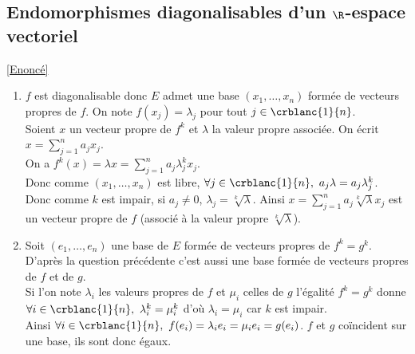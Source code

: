 \documentclass[8pt]{book}
\begin{document}
	\subsection{Endomorphismes diagonalisables d'un $\R$-espace vectoriel }
	\label{Endomorphismes diagonalisables d'un R-espace vectoriel corrigé}
	\textcolor{blue}{\hyperref[Endomorphismes diagonalisables d'un R-espace vectoriel]{[Enoncé]}}\\
	\begin{enumerate}[leftmargin=*]
		\item $f$ est diagonalisable donc $E$ admet une base $(x_1,\dots,x_n)$ formée de vecteurs propres de $f$. On note $f(x_j)=\lambda_j$ pour tout $j\in \crblanc{1}{n}$.\\
		Soient $x$ un vecteur propre de $f^k$ et $\lambda$ la valeur propre associée. On écrit $x=\displaystyle\sum_{j=1}^na_jx_j$.\\
		On a $f^k(x)=\lambda x=\displaystyle\sum_{j=1}^na_j\lambda_j^kx_j$.\\
		Donc comme $(x_1,\dots,x_n)$ est libre, $\forall j\in \crblanc{1}{n},\ a_j\lambda=a_j\lambda_j^k$.\\
		Donc comme $k$ est impair, si $a_j\ne 0$, $\lambda_j=\sqrt[k]\lambda$. Ainsi $x=\displaystyle\sum_{j=1}^na_j\sqrt[k]\lambda x_j$ est un vecteur propre de $f$ (associé à la valeur propre $\sqrt[k]\lambda$).
		\item Soit $(e_1,\dots,e_n)$ une base de $E$ formée de vecteurs propres de $f^k=g^k$. D'après la question précédente c'est aussi une base formée de vecteurs propres de $f$ et de $g$.\\
		Si l'on note $\lambda_i$ les valeurs propres de $f$ et $\mu_i$ celles de $g$ l'égalité $f^k=g^k$ donne $\forall i\in \crblanc{1}{n},\ \lambda_i^k=\mu_i^k$ d'où $\lambda_i=\mu_i$ car $k$ est impair.\\
		Ainsi $\forall i\in \crblanc{1}{n},\ f(e_i)=\lambda_ie_i=\mu_ie_i=g(e_i)$. $f$ et $g$ coïncident sur une base, ils sont donc égaux.
	\end{enumerate}
	
\end{document}
